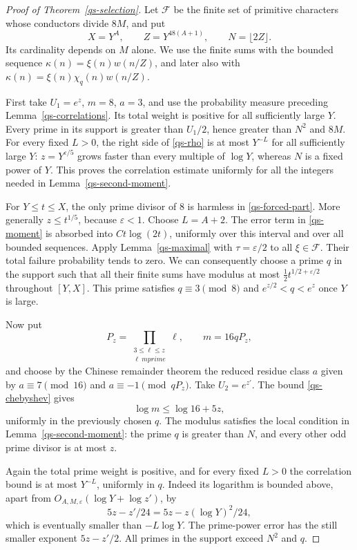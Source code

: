 \begin{proof}[Proof of Theorem~\ref{qs-selection}]
Let $\mathcal F$ be the finite set of primitive characters whose
conductors divide $8M$, and put
\[
 X=Y^A,\qquad Z=Y^{48(A+1)},\qquad N=\lfloor2Z\rfloor.
\]
Its cardinality depends on $M$ alone. We use the finite sums with
the bounded sequence $\kappa(n)=\xi(n)w(n/Z)$, and later also
with $\kappa(n)=\xi(n)\chi_q(n)w(n/Z)$.

First take $U_1=e^z$, $m=8$, $a=3$, and use the probability
measure preceding Lemma~\ref{qs-correlations}. Its total weight
is positive for all sufficiently large $Y$. Every prime in its
support is greater than $U_1/2$, hence greater than $N^2$ and
$8M$. For every fixed $L>0$, the right side of
\eqref{qs-rho} is at most $Y^{-L}$ for all sufficiently large
$Y$: $z=Y^{\varepsilon/5}$ grows faster than every multiple of
$\log Y$, whereas $N$ is a fixed power of $Y$.
This proves the correlation estimate uniformly for all the
integers needed in Lemma~\ref{qs-second-moment}.

For $Y\le t\le X$, the only prime divisor of $8$ is harmless
in \eqref{qs-forced-part}. More generally $z\le t^{1/5}$,
because $\varepsilon<1$. Choose $L=A+2$. The error term in
\eqref{qs-moment} is absorbed into $Ct\log(2t)$, uniformly
over this interval and over all bounded sequences. Apply
Lemma~\ref{qs-maximal} with $\tau=\varepsilon/2$ to all
$\xi\in\mathcal F$. Their total failure probability tends
to zero. We can consequently choose a prime $q$ in the support
such that all their finite sums have modulus at most
$\tfrac12t^{1/2+\varepsilon/2}$ throughout $[Y,X]$.
This prime satisfies $q\equiv3\pmod8$ and
$e^{z/2}<q<e^z$ once $Y$ is large.

Now put
\[
 P_z=\prod_{\substack{3\le\ell\le z\\\ell\ {
m prime}}}\ell,
       \qquad m=16qP_z,
\]
and choose by the Chinese remainder theorem the reduced residue
class $a$ given by
$a\equiv7\pmod{16}$ and $a\equiv-1\pmod{qP_z}$.
Take $U_2=e^{z'}$. The bound \eqref{qs-chebyshev} gives
\[
 \log m\le\log16+5z,
\]
uniformly in the previously chosen $q$.
The modulus satisfies the local condition in
Lemma~\ref{qs-second-moment}: the prime $q$ is greater than
$N$, and every other odd prime divisor is at most $z$.

Again the total prime weight is positive, and for every fixed
$L>0$ the correlation bound is at most $Y^{-L}$, uniformly in
$q$. Indeed its logarithm is bounded above, apart from
$O_{A,M,\varepsilon}(\log Y+\log z')$, by
\[
 5z-z'/24=5z-z(\log Y)^2/24,
\]
which is eventually smaller than $-L\log Y$. The prime-power
error has the still smaller exponent $5z-z'/2$.
All primes in the support exceed $N^2$ and $q$.


\end{proof}
